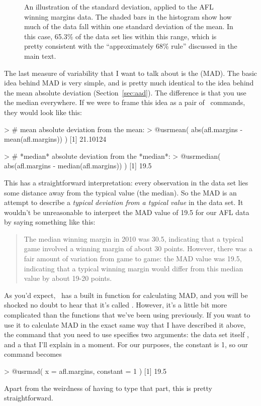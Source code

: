 \begin{figure}[t]
\begin{center}
\caption{An illustration of the standard deviation, applied to the AFL winning margins data. The shaded bars in the histogram show how much of the data fall within one standard deviation of the mean. In this case, 65.3\% of the data set lies within this range, which is pretty consistent with the ``approximately 68\% rule'' discussed in the main text.}
\label{fig:aflsd}
\HR
\end{center}
\end{figure}



The last measure of variability that I want to talk about is the  (MAD). The basic idea behind MAD is very simple, and is pretty much identical to the idea behind the mean absolute deviation (Section~\ref{sec:aad}). The difference is that you use the median everywhere. If we were to frame this idea as a pair of \R\ commands, they would look like this:

\begin{rblock1}
> # mean absolute deviation from the mean:
> @usr{mean( abs(afl.margins - mean(afl.margins)) )}
[1] 21.10124

> # *median* absolute deviation from the *median*:
> @usr{median( abs(afl.margins - median(afl.margins)) )}
[1] 19.5
\end{rblock1}
This has a straightforward interpretation: every observation in the data set lies some distance away from the typical value (the median). So the MAD is an attempt to describe a {\it typical deviation from a typical value} in the data set. It wouldn't be unreasonable to interpret the MAD value of 19.5 for our AFL data by saying something like this:
\begin{quote}
The median winning margin in 2010 was 30.5, indicating that a typical game involved a winning margin of about 30 points. However, there was a fair amount of variation from game to game: the MAD value was 19.5, indicating that a typical winning margin would differ from this median value by about 19-20 points.
\end{quote}
As you'd expect, \R\ has a built in function for calculating MAD, and you will be shocked no doubt to hear that it's called . However, it's a little bit more complicated than the functions that we've been using previously. If you want to use it to calculate MAD in the exact same way that I have described it above, the command that you need to use specifies two arguments: the data set itself , and a  that I'll explain in a moment. For our purposes, the constant is 1, so our command becomes
\begin{rblock1}
> @usr{mad( x = afl.margins, constant = 1 )}
[1] 19.5
\end{rblock1}
Apart from the weirdness of having to type that  part, this is pretty straightforward.

